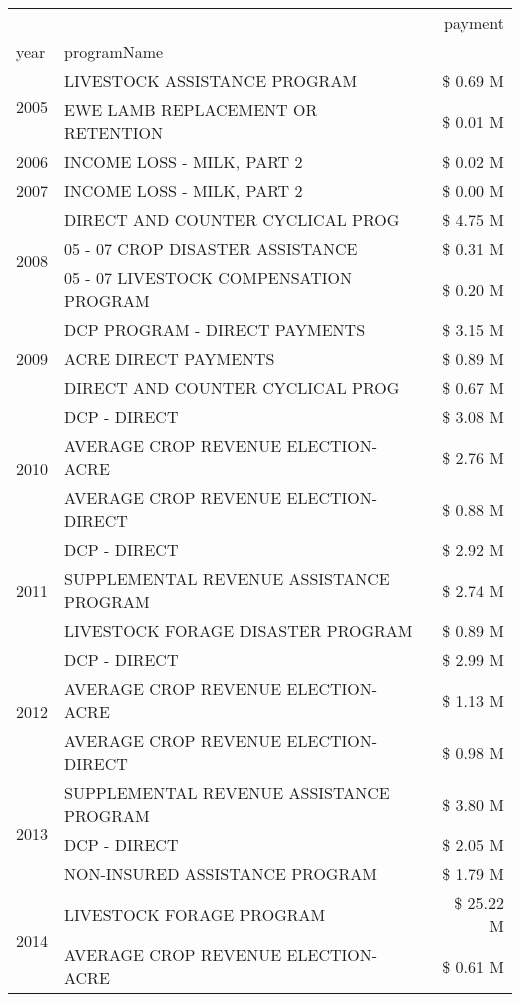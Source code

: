 \begin{tabular}{llr}
\toprule
 &  & payment \\
year & programName &  \\
\midrule
\multirow[t]{2}{*}{2005} & LIVESTOCK ASSISTANCE PROGRAM & \$ 0.69 M \\
 & EWE LAMB REPLACEMENT OR RETENTION & \$ 0.01 M \\
\cline{1-3}
2006 & INCOME LOSS - MILK, PART 2 & \$ 0.02 M \\
\cline{1-3}
2007 & INCOME LOSS - MILK, PART 2 & \$ 0.00 M \\
\cline{1-3}
\multirow[t]{3}{*}{2008} & DIRECT AND COUNTER CYCLICAL PROG & \$ 4.75 M \\
 & 05 - 07 CROP DISASTER ASSISTANCE & \$ 0.31 M \\
 & 05 - 07 LIVESTOCK COMPENSATION PROGRAM & \$ 0.20 M \\
\cline{1-3}
\multirow[t]{3}{*}{2009} & DCP PROGRAM - DIRECT PAYMENTS & \$ 3.15 M \\
 & ACRE DIRECT PAYMENTS & \$ 0.89 M \\
 & DIRECT AND COUNTER CYCLICAL PROG & \$ 0.67 M \\
\cline{1-3}
\multirow[t]{3}{*}{2010} & DCP - DIRECT & \$ 3.08 M \\
 & AVERAGE CROP REVENUE ELECTION-ACRE & \$ 2.76 M \\
 & AVERAGE CROP REVENUE ELECTION-DIRECT & \$ 0.88 M \\
\cline{1-3}
\multirow[t]{3}{*}{2011} & DCP - DIRECT & \$ 2.92 M \\
 & SUPPLEMENTAL REVENUE ASSISTANCE PROGRAM & \$ 2.74 M \\
 & LIVESTOCK FORAGE DISASTER PROGRAM & \$ 0.89 M \\
\cline{1-3}
\multirow[t]{3}{*}{2012} & DCP - DIRECT & \$ 2.99 M \\
 & AVERAGE CROP REVENUE ELECTION-ACRE & \$ 1.13 M \\
 & AVERAGE CROP REVENUE ELECTION-DIRECT & \$ 0.98 M \\
\cline{1-3}
\multirow[t]{3}{*}{2013} & SUPPLEMENTAL REVENUE ASSISTANCE PROGRAM & \$ 3.80 M \\
 & DCP - DIRECT & \$ 2.05 M \\
 & NON-INSURED ASSISTANCE PROGRAM & \$ 1.79 M \\
\cline{1-3}
\multirow[t]{3}{*}{2014} & LIVESTOCK FORAGE PROGRAM & \$ 25.22 M \\
 & AVERAGE CROP REVENUE ELECTION-ACRE & \$ 0.61 M \\

\end{tabular}
